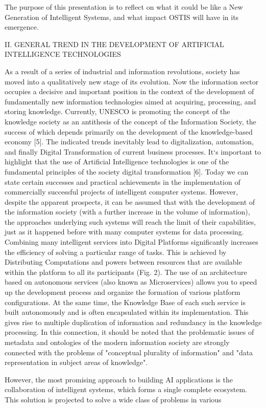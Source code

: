 \documentclass[10pt]{article}
\begin{document}
{\begin{multicols*}{2}
The purpose of this presentation is to reflect on what
it could be like a New Generation of Intelligent Systems,
and what impact OSTIS will have in its emergence.
\vspace{10pt}
\begin{center}
  {\large II. G}ENERAL TREND IN THE DEVELOPMENT OF
{\large A}RTIFICIAL {\large I}NTELLIGENCE TECHNOLOGIES
 \end{center}
 
As a result of a series of industrial and information
revolutions, society has moved into a qualitatively new
stage of its evolution. Now the information sector occupies a decisive and important position in the context
of the development of fundamentally new information
technologies aimed at acquiring, processing, and storing knowledge. Currently, UNESCO is promoting the
concept of the knowledge society as an antithesis of
the concept of the Information Society, the success of
which depends primarily on the development of the
knowledge-based economy [5]. The indicated trends inevitably lead to digitalization, automation, and finally
Digital Transformation of current business processes. It‘s
important to highlight that the use of Artificial Intelligence technologies is one of the fundamental principles
of the society digital transformation [6]. Today we can
state certain successes and practical achievements in
the implementation of commercially successful projects
of intelligent computer systems. However, despite the
apparent prospects, it can be assumed that with the
development of the information society (with a further
increase in the volume of information), the approaches
underlying such systems will reach the limit of their capabilities, just as it happened before with many computer
systems for data processing. Combining many intelligent
services into Digital Platforms significantly increases the
efficiency of solving a particular range of tasks. This
is achieved by Distributing Computations and powers
between resources that are available within the platform
to all its participants (Fig. 2). The use of an architecture based on autonomous services (also known as
Microservices) allows you to speed up the development
process and organize the formation of various platform
configurations. At the same time, the Knowledge Base
of each such service is built autonomously and is often
encapsulated within its implementation. This gives rise
to multiple duplication of information and redundancy in
the knowledge processing. In this connection, it should
be noted that the problematic issues of metadata and
ontologies of the modern information society are strongly
connected with the problems of "conceptual plurality of
information" and "data representation in subject areas of
knowledge".
\vspace{5pt}

However, the most promising approach to building AI
applications is the collaboration of intelligent systems,
which forms a single complete ecosystem. This solution is projected to solve a wide class of problems in various
\end{multicols*}

\clearpage


}
\end{document}
